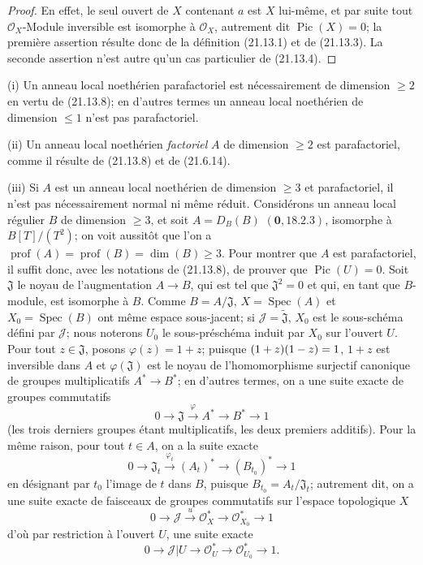\begin{proof}
En effet, le seul ouvert de $X$ contenant $a$ est $X$ lui-même, et par suite tout
$\mathcal O_X$-Module inversible est isomorphe à $\mathcal O_X$, autrement dit
$\operatorname{Pic}(X)=0$; la première assertion résulte donc de la définition
(21.13.1) et de (21.13.3). La seconde assertion n'est autre qu'un cas particulier de
(21.13.4).
\end{proof}

\begin{examples}[21.13.9]
\label{IV.21.13.9}
(i) Un anneau local noethérien parafactoriel est nécessairement de dimension
$\geq2$ en vertu de (21.13.8); en d'autres termes un anneau local noethérien de
dimension $\leq1$ n'est pas parafactoriel.

(ii) Un anneau local noethérien \emph{factoriel} $A$ de dimension $\geq2$ est
parafactoriel, comme il résulte de (21.13.8) et de (21.6.14).

(iii) Si $A$ est un anneau local noethérien de dimension $\geq3$ et parafactoriel, il
n'est pas nécessairement normal ni même réduit. Considérons un anneau local régulier
$B$ de dimension $\geq3$, et soit $A=D_B(B)$ $(\mathbf 0, 18.2.3)$, isomorphe à
$B[T]/(T^2)$; on voit aussitôt que l'on a
$\operatorname{prof}(A)=\operatorname{prof}(B)=\dim(B)\geq3$. Pour montrer que $A$
est parafactoriel, il suffit donc, avec les notations de (21.13.8), de prouver que
$\operatorname{Pic}(U)=0$. Soit $\mathfrak J$ le noyau de l'augmentation $A\to B$,
qui est tel que $\mathfrak J^2=0$ et qui, en tant que $B$-module, est isomorphe à $B$.
Comme $B=A/\mathfrak J$, $X=\operatorname{Spec}(A)$ et
$X_0=\operatorname{Spec}(B)$ ont même espace sous-jacent; si
$\mathscr J=\widetilde{\mathfrak J}$, $X_0$ est le sous-schéma défini par
$\mathscr J$; nous noterons $U_0$ le sous-préschéma induit par $X_0$ sur l'ouvert
$U$. Pour tout $z\in\mathfrak J$, posons $\varphi(z)=1+z$; puisque
$(1+z)(1- z)=1$, $1+z$ est inversible dans $A$ et $\varphi(\mathfrak J)$ est le noyau
de l'homomorphisme surjectif canonique de groupes multiplicatifs $A^*\to B^*$; en
d'autres termes, on a une suite exacte de groupes commutatifs
\[
  0\longrightarrow\mathfrak J\xrightarrow{\varphi}A^*\longrightarrow B^*
  \longrightarrow1
\]
(les trois derniers groupes étant multiplicatifs, les deux premiers additifs). Pour la
même raison, pour tout $t\in A$, on a la suite exacte
\[
  0\longrightarrow\mathfrak J_t\xrightarrow{\varphi_t}(A_t)^*
  \longrightarrow(B_{t_0})^*\longrightarrow1
\]
en désignant par $t_0$ l'image de $t$ dans $B$, puisque
$B_{t_0}=A_t/\mathfrak J_t$; autrement dit, on a une suite exacte de faisceaux de
groupes commutatifs sur l'espace topologique $X$
\[
  0\longrightarrow\mathscr J\xrightarrow{u}\mathcal O_X^*
  \longrightarrow\mathcal O_{X_0}^*\longrightarrow1
\]
d'où par restriction à l'ouvert $U$, une suite exacte
\[
  0\longrightarrow\mathscr J|U\longrightarrow\mathcal O_U^*
  \longrightarrow\mathcal O_{U_0}^*\longrightarrow1.
\]


\end{examples}
